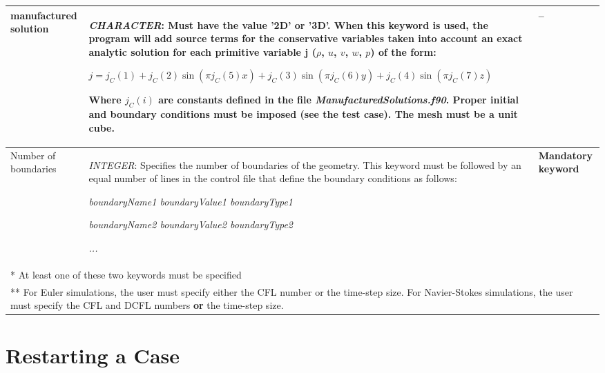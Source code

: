 \documentclass[a4paper,10pt]{report}
\begin{document}
\begin{longtable}{|p{4cm}|p{10cm}|p{2.2cm}|}
manufactured solution & \textit{CHARACTER}: Must have the value '2D' or '3D'. When this keyword is used, the program will add source terms for the conservative variables taken into account an exact analytic solution for each primitive variable j ($\rho$, $u$, $v$, $w$, $p$) of the form:\
 
$j = j_C(1) + j_C(2) \sin(\pi j_C(5) x) + j_C(3) \sin(\pi j_C(6) y) + j_C(4) \sin(\pi j_C(7) z) $\

Where $j_C(i)$ are constants defined in the file \textit{ManufacturedSolutions.f90}. Proper initial and boundary conditions must be imposed (see the test case). The mesh must be a unit cube.
  & -- \\ \hline

Number of boundaries & \textit{INTEGER}: Specifies the number of boundaries of the geometry. This keyword must be followed by an equal number of lines in the control file that define the boundary conditions as follows: \ 

\begin{center}
\textit{boundaryName1 boundaryValue1 boundaryType1} \ 

\textit{boundaryName2 boundaryValue2 boundaryType2} \

\textit{...} 
\end{center}
& \textbf{Mandatory keyword} \\ \hline

\multicolumn{3}{p{16.4cm}}{*  At least one of these two keywords must be specified} \\

\multicolumn{3}{p{16.4cm}}{** For Euler simulations, the user must specify either the CFL number or the time-step size. For Navier-Stokes simulations, the user must specify the CFL and DCFL numbers \textbf{or} the time-step size.}

\end{longtable}

\chapter{Restarting a Case}
\end{document}

